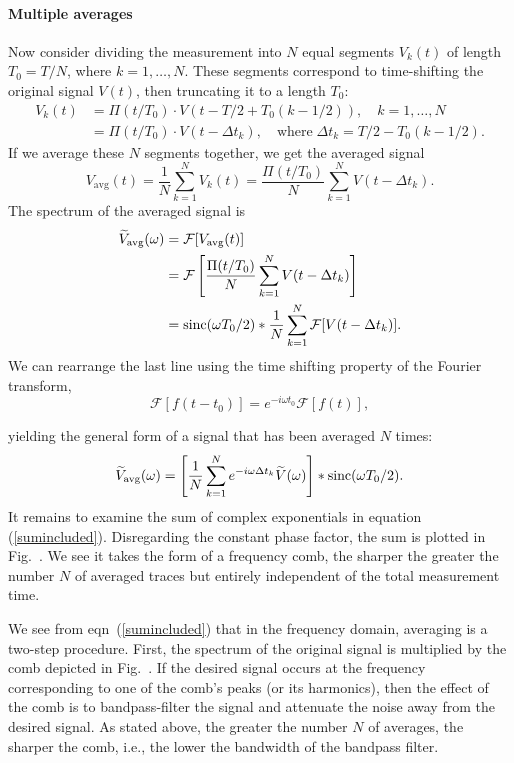\paragraph{Multiple averages}

Now consider dividing the measurement into $N$ equal segments $V_k(t)$ of length
$T_0=T/N$, where $k=1,\ldots,N$. These segments correspond to time-shifting the
original signal $V(t)$, then truncating it to a length $T_0$:
%
\begin{align*}
   V_k(t)&=\Pi(t/T_0)\cdot V(t-T/2+T_0(k-1/2)),\quad k=1,\dots,N\\
   &=\Pi(t/T_0)\cdot V(t-\Delta t_k),\quad\text{where}\;
   \Delta t_k=T/2-T_0(k-1/2).
\end{align*}
%
If we average these $N$ segments together, we get the averaged signal
%
$$
V_\text{avg}(t)=\frac{1}{N}\sum\limits_{k=1}^NV_k(t)
=\frac{\Pi(t/T_0)}{N}\sum\limits_{k=1}^NV(t-\Delta t_k).
$$
%
The spectrum of the averaged signal is
%
\begin{align*}
   \widetilde{V}_\text{avg}(\omega)&=\mathcal{F}[V_\text{avg}(t)]\\
   &=\mathcal{F}\left[\frac{\Pi(t/T_0)}{N}\sum\limits_{k=1}^NV(t-\Delta
   t_k)\right]\\
   &=\operatorname{sinc}(\omega T_0/2)
   *\frac{1}{N}\sum\limits_{k=1}^N\mathcal{F}[V(t-\Delta t_k)].
\end{align*}
%
We can rearrange the last line using the time shifting property of the Fourier
transform,
%
$$
\mathcal{F}[f(t-t_0)]=e^{-i\omega t_0}\mathcal{F}[f(t)],
$$

\noindent
yielding the general form of a signal that has been averaged $N$ times:
%
\begin{align}
   \label{sumincluded}
   \widetilde{V}_\text{avg}(\omega)=
   \left[\frac{1}{N}\sum\limits_{k=1}^Ne^{-i\omega\Delta t_k}
   \widetilde{V}(\omega)\right]
   *
   \operatorname{sinc}(\omega T_0/2)
   .
\end{align}
%
It remains to examine the sum of complex exponentials in equation
(\ref{sumincluded}). Disregarding the constant phase factor, the sum is plotted
in Fig.~. We see it takes the form of a frequency comb, the sharper
the greater the number $N$ of averaged traces but entirely independent of the
total measurement time.

We see from eqn~(\ref{sumincluded}) that in the frequency domain, averaging is a
two-step procedure. First, the spectrum of the original signal is multiplied by
the comb depicted in Fig.~. If the desired signal occurs at the frequency
corresponding to one of the comb's peaks (or its harmonics), then the effect of
the comb is to bandpass-filter the signal and attenuate the noise away from the
desired signal. As stated above, the greater the number $N$ of averages, the
sharper the comb, i.e., the lower the bandwidth of the bandpass filter.

